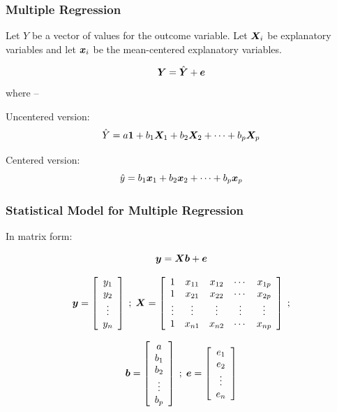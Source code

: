\documentclass{beamer}
\begin{document}
\begin{frame}
  \frametitle{Multiple Regression}

Let $Y$ be a vector of values for the outcome variable. Let $\bm{X}_i$ be explanatory variables and let $\bm{x}_i$ be the mean-centered explanatory variables.
\medskip

$$
\bm{Y} = \hat{\bm{Y}} + \bm{e}
$$
where --
\bigskip

Uncentered version:
$$
\hat{Y} = a\bm{1} + b_1\bm{X}_1 + b_2\bm{X}_2 + \cdots + b_p\bm{X}_p
$$

Centered version:
$$
\hat{y} = b_1\bm{x}_1 + b_2\bm{x}_2 + \cdots + b_p\bm{x}_p
$$


\end{frame}
\begin{frame}
  \frametitle{Statistical Model for Multiple Regression}

In matrix form:

$$
\bm{y} = \bm{X}\bm{b} + \bm{e}
$$

$$
\bm{y} = \left[ \begin{array}{c}
y_1 \\ y_2 \\ \vdots \\y_n \\
\end{array}
\right]
\;
;
\;
\bm{X} = \left[ \begin{array}{ccccc}
1 & x_{11} & x_{12} & \cdots & x_{1p} \\
1 & x_{21} & x_{22} & \cdots & x_{2p} \\
\vdots & \vdots & \vdots & \vdots & \vdots \\
1 & x_{n1} & x_{n2} & \cdots & x_{np} \\
\end{array}
\right]
\;
;
$$

$$
\bm{b} = \left[ \begin{array}{c}
a \\ b_1 \\ b_2 \\ \vdots \\ b_p \\
\end{array}
\right]
\;
;
\;
\bm{e} = \left[ \begin{array}{c}
e_1 \\ e_2 \\ \vdots \\e_n \\
\end{array}
\right]
$$

\end{frame}
\end{document}
